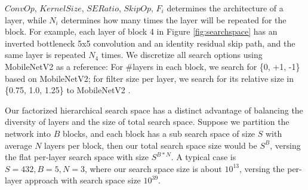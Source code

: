 \documentclass[10pt,twocolumn,letterpaper]{article}
\begin{document}
\noindent
$ConvOp$, $KernelSize$, $SERatio$, $SkipOp$, $F_i$ determines the architecture of a layer, while $N_i$ determines how many times the layer will be repeated for the block. For example, each layer of block 4 in Figure \ref{fig:searchspace} has an inverted bottleneck 5x5 convolution and an identity residual skip path, and the same layer is repeated $N_4$ times. We discretize all search options using MobileNetV2 as a reference: For \#layers in each block, we search for \{0, +1, -1\} based on MobileNetV2; for filter size per layer, we search for its relative size in \{0.75, 1.0, 1.25\} to MobileNetV2 \cite{mobilenetv218}.
%

Our factorized hierarchical search space has a distinct advantage of balancing the diversity of layers and the size of total search space. Suppose we partition the network into $B$ blocks, and each block has a sub search space of size $S$ with average $N$ layers per block, then our total search space size would be $S^B$, versing the flat per-layer search space with size $S ^{B*N}$. A typical case is $S=432, B=5, N=3$, where our search space size is about $10^{13}$, versing the per-layer approach with search space size $10^{39}$.
\end{document}
